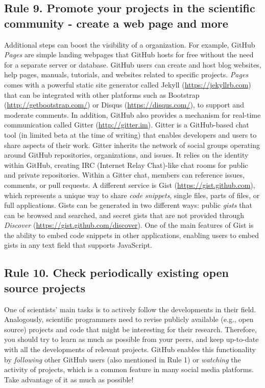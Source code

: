\documentclass[10pt,letterpaper]{article}
\begin{document}
\subsection*{Rule 9. Promote your projects in the scientific community -
create a web page and
more}\label{rule-9.-promote-your-projects-in-the-scientific-community---create-a-web-page-and-more}

Additional steps can boost the visibility of a organization.
For example, GitHub \emph{Pages} are simple landing webpages that GitHub
hosts for free without the need for a separate server or database. GitHub users
can create and host blog websites, help pages, manuals, tutorials, and
websites related to specific projects. \emph{Pages} comes with a
powerful static site generator called Jekyll (\url{https://jekyllrb.com}) that
can be integrated with other platforms such as Bootstrap
(\url{http://getbootstrap.com/}) or Disqus (\url{https://disqus.com/}), to support
and moderate comments. In addition, GitHub also provides a mechanism for
real-time communication called Gitter (\url{http://gitter.im}). Gitter is a
GitHub-based chat tool (in limited beta at the time of writing) that
enables developers and users to share aspects of their work. Gitter
inherits the network of social groups operating around GitHub
repositories, organizations, and issues. It relies on the identity
within GitHub, creating IRC (Internet Relay Chat)-like chat rooms for
public and private repositories. Within a Gitter chat, members can
reference issues, comments, or pull requests. A different service is
Gist (\url{https://gist.github.com}), which represents a unique way to share
\emph{code snippets}, single files, parts of files, or full
applications. Gists can be generated in two different ways: public
\emph{gists} that can be browsed and searched, and secret gists that
are not provided through \emph{Discover}
(\url{https://gist.github.com/discover}). One of the main features of Gist is
the ability to embed code snippets in other applications, enabling
users to embed gists in any text field that supports JavaScript.

\subsection*{Rule 10. Check periodically existing open source
projects}\label{rule-10.-check-periodically-existing-open-source-projects}

One of scientists' main tasks is to actively follow the
developments in their field. Analogously, scientific programmers need to
revise publicly available (e.g., open source) projects and code that might
be interesting for their research. Therefore, you should try to learn as
much as possible from your peers, and keep up-to-date with all the
developments of relevant projects. GitHub enables this functionality by
\emph{following} other GitHub users (also mentioned in Rule 1) or
\emph{watching} the activity of projects, which is a common feature in
many social media platforms. Take advantage of it as much as possible!
\end{document}
